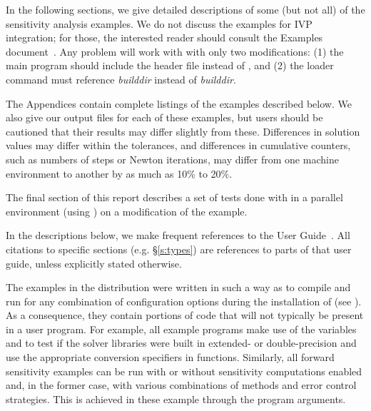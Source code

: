 
\vspace{0.2in}\noindent
In the following sections, we give detailed descriptions of some (but
not all) of the sensitivity analysis examples. We do not discuss the 
examples for IVP integration; for those, the interested reader should consult
the {\cvode} Examples document~\cite{cvode_ex}. Any {\cvode} problem
will work with {\cvodes} with only two modifications: (1) the main program
should include the header file  instead of , and
(2) the loader command must reference
{\em builddir} instead of
{\em builddir}.

The Appendices contain complete listings
of the examples described below.  We also give our output files for
each of these examples, but users should be cautioned that their
results may differ slightly from these.  Differences in solution
values may differ within the tolerances, and differences in cumulative
counters, such as numbers of steps or Newton iterations, may differ
from one machine environment to another by as much as 10\% to 20\%.

The final section of this report describes a set of tests done with
{\cvodes} in a parallel environment (using {\nvecp}) on a modification of
the  example.

In the descriptions below, we make frequent references to the {\cvodes}
User Guide~\cite{cvodes_ug}.  All citations to specific sections
(e.g. \S\ref{s:types}) are references to parts of that user guide, unless
explicitly stated otherwise.

\vspace{0.2in}
The examples in the {\cvodes} distribution were written in such a way as
to compile and run for any combination of configuration options during
the installation of {\sundials} (see ). As a consequence,
they contain portions of code that will not typically be present in a
user program. For example, all example programs make use of the
variables  and 
to test if the solver libraries
were built in extended- or double-precision and use the appropriate conversion 
specifiers in  functions. Similarly, all forward sensitivity
examples can be run with or without sensitivity computations enabled and,
in the former case, with various combinations of methods and error control 
strategies. This is achieved in these example through the program arguments.

